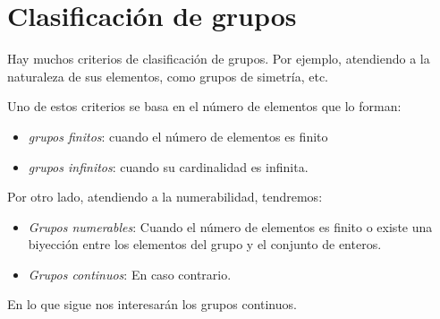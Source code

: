\section{Clasificación de grupos}
Hay muchos criterios de clasificación de grupos. Por ejemplo, atendiendo a la naturaleza
de sus elementos, como grupos de simetría, etc.

Uno de estos criterios se basa en el número de elementos que lo forman:
\begin{itemize}
\item \emph{grupos finitos}: cuando el número de elementos es finito
\item \emph{grupos infinitos}: cuando su cardinalidad es infinita.
\end{itemize}

Por otro lado, atendiendo a la numerabilidad, tendremos:
\begin{itemize}
\item \emph{Grupos numerables}:
  Cuando el número de elementos es finito o existe una biyección entre los elementos
  del grupo y el conjunto de enteros.
\item \emph{Grupos continuos}: En caso contrario.
\end{itemize}

En lo que sigue nos interesarán los grupos continuos.




 
